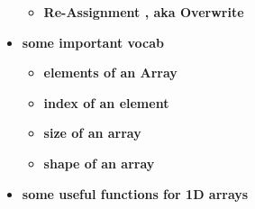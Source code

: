 \documentclass[11pt]{article}
\begin{document}
\begin{itemize}
\begin{itemize}
			\item \textbf{ \Large Re-Assignment , aka Overwrite} \\  \vspace{30mm}			

		\end{itemize}
		
		\newpage
		\item \textbf{ \LARGE some important vocab  }\\
	
		
		\begin{itemize}
			\item \textbf{ \Large \color{blue} elements \color{black} of an \color{mypurple}Array } \\  \vspace{30mm}
            			
            		\item \textbf{ \Large \color{blue}  index \color{black} of an \color{mypurple} element } \\  \vspace{30mm}
            				
            		\item \textbf{ \Large \color{blue} size \color{black} of an \color{mypurple} array} \\  \vspace{30mm}			
            				
			\item \textbf{ \Large \color{blue} shape \color{black} of an \color{mypurple} array} \\  \vspace{30mm}		

		\end{itemize}

			\newpage
		\item \textbf{ \LARGE some useful functions for 1D arrays}\\
	

\end{itemize}
\end{document}
